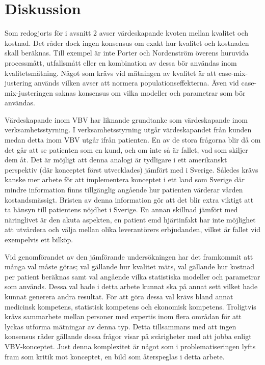 \section{Diskussion}

Som redogjorts för i avsnitt 2 avser värdeskapande kvoten mellan kvalitet och kostnad. Det råder dock ingen konsensus om exakt hur kvalitet och kostnaden skall beräknas. Till exempel är inte Porter och Nordenström överens huruvida processmått, utfallsmått eller en kombination av dessa bör användas inom kvalitetsmätning. Något som krävs vid mätningen av kvalitet är att case-mix-justering används vilken avser att normera populationseffekterna. Även vid case-mix-justeringen saknas konsensus om vilka modeller och parametrar som bör användas.

Värdeskapande inom VBV har liknande grundtanke som värdeskapande inom verksamhetsstyrning. I verksamhetsstyrning utgår värdeskapandet från kunden medan detta inom VBV utgår ifrån patienten. En av de stora frågorna blir då om det går att se patienten som en kund, och om inte så är fallet, vad som skiljer dem åt. Det är möjligt att denna analogi är tydligare i ett amerikanskt perspektiv (där konceptet först utvecklades) jämfört med i Sverige. Således krävs kanske mer arbete för att implementera konceptet i ett land som Sverige där mindre information finns tillgänglig angående hur patienten värderar vården kostandsmässigt. Bristen av denna information gör att det blir extra viktigt att ta hänsyn till patientens nöjdhet i Sverige. En annan skillnad jämfört med näringlivet är den akuta aspekten, en patient emd hjärtinfakt har inte möjlighet att utvärdera och välja mellan olika leverantörers erbjudanden, vilket är fallet vid exempelvis ett bilköp.

Vid genomförandet av den jämförande undersökningen har det framkommit att många val måste göras; val gällande hur kvalitet mäts, val gällande hur kostnad per patient beräknas samt val angående vilka statistiska modeller och parametrar som används. Dessa val hade i detta arbete kunnat ska på annat sett vilket hade kunnat generera andra resultat. För att göra dessa val krävs bland annat medicinsk kompetens, statistisk kompetens och ekonomisk kompetens. Troligtvis krävs sammarbete mellan personer med expertis inom flera områdan för att lyckas utforma mätningar av denna typ. Detta tillsammans med att ingen konsensus råder gällande dessa frågor visar på svårigheter med att jobba enligt VBV-konceptet. Just denna komplexitet är något som i problematiseringen lyfts fram som kritik mot konceptet, en bild som återspeglas i detta arbete.

